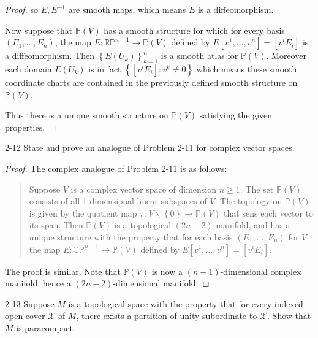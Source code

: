 \begin{proof}
    so \( E, E^{-1} \) are smooth maps, which means \( E \) is a diffeomorphism.

    \bigskip

    Now suppose that \( \mathbb{P}(V) \) has a smooth structure for which for every basis \( (E_{1}, \ldots, E_{n}) \), the map \( E: \mathbb{RP}^{n-1} \to \mathbb{P}(V) \) defined by \( E[v^{1}, \ldots, v^{n}] = [v^{i}E_{i}] \) is a diffeomorphism. Then \( {\left\{ E(U_{k}) \right\}}_{k=1}^{n} \) is a smooth atlas for \( \mathbb{P}(V) \). Moreover each domain \( E(U_{k}) \) is in fact \( \left\{ [v^{i}E_{i}]: v^{k} \ne 0 \right\} \) which means these smooth coordinate charts are contained in the previously defined smooth structure on \( \mathbb{P}(V) \).

    Thus there is a unique smooth structure on \( \mathbb{P}(V) \) satisfying the given properties.
\end{proof}

\begin{problem}{2-12}
    State and prove an analogue of Problem 2-11 for complex vector spaces.
\end{problem}

\begin{proof}
    The complex analogue of Problem 2-11 is as follows:
    \begin{quotation}
        Suppose \( V \) is a complex vector space of dimension  \( n \ge 1 \). The set \( \mathbb{P}(V) \) consists of all 1-dimensional linear subspaces of \( V \). The topology on \( \mathbb{P}(V) \) is given by the quotient map \( \pi: V \smallsetminus \left\{ 0 \right\} \to \mathbb{P}(V) \) that sens each vector to its span. Then \( \mathbb{P}(V) \) is a topological \( (2n - 2) \)-manifold, and has a unique structure with the property that for each basis \( (E_{1}, \ldots, E_{n}) \) for \( V \), the map \( E: \mathbb{CP}^{n-1} \to \mathbb{P}(V) \) defined by \( E[v^{1}, \ldots, v^{n}] = [v^{i}E_{i}] \).
    \end{quotation}

    The proof is similar. Note that \( \mathbb{P}(V) \) is now a \( (n-1) \)-dimensional complex manifold, hence a \( (2n - 2) \)-dimensional manifold.
\end{proof}

\begin{problem}{2-13}
    Suppose \( M \) is a topological space with the property that for every indexed open cover \( \mathcal{X} \) of \( M \), there exists a partition of unity subordinate to \( \mathcal{X} \). Show that \( M \) is paracompact.
\end{problem}

